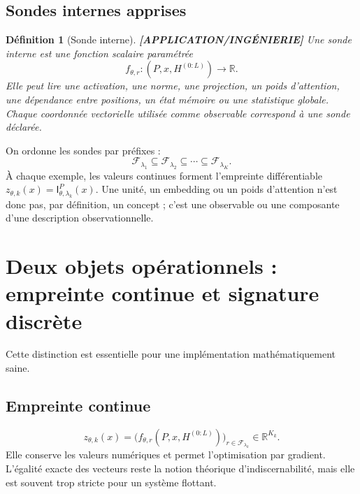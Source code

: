 \documentclass[11pt,a4paper]{article}
\newtheorem{definition}{Définition}[section]
\theoremstyle{remark}
\newcommand{\R}{\mathbb R}
\newcommand{\F}{\mathcal F}
\newcommand{\Emp}{\mathsf I}
\begin{document}
\subsection{Sondes internes apprises}
\begin{definition}[Sonde interne] \textbf{[APPLICATION/INGÉNIERIE]}
Une sonde interne est une fonction scalaire paramétrée
\[
f_{\theta,r}: (P,x,H^{(0:L)})\longrightarrow\R.
\]
Elle peut lire une activation, une norme, une projection, un poids d'attention, une dépendance entre positions, un état mémoire ou une statistique globale. Chaque coordonnée vectorielle utilisée comme observable correspond à une sonde déclarée.
\end{definition}

On ordonne les sondes par préfixes :
\[
\F_{\lambda_1}\subseteq\F_{\lambda_2}\subseteq\cdots\subseteq\F_{\lambda_K}.
\]
À chaque exemple, les valeurs continues forment l'empreinte différentiable $z_{\theta,k}(x)=\Emp_{\theta,\lambda_k}^P(x)$. Une unité, un embedding ou un poids d'attention n'est donc pas, par définition, un concept ; c'est une observable ou une composante d'une description observationnelle.

\section{Deux objets opérationnels : empreinte continue et signature discrète}

Cette distinction est essentielle pour une implémentation mathématiquement saine.

\subsection{Empreinte continue}
\[
z_{\theta,k}(x)=\big(f_{\theta,r}(P,x,H^{(0:L)})\big)_{r\in\F_{\lambda_k}}\in\R^{K_k}.
\]
Elle conserve les valeurs numériques et permet l'optimisation par gradient. L'égalité exacte des vecteurs reste la notion théorique d'indiscernabilité, mais elle est souvent trop stricte pour un système flottant.
\end{document}
